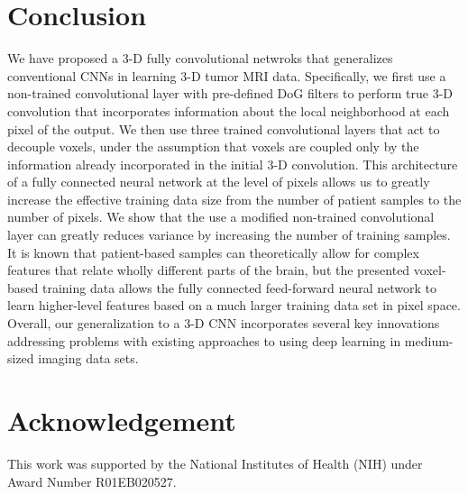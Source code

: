 \documentclass{llncs}
\begin{document}
\section{Conclusion}
We have proposed a 3-D fully convolutional netwroks that generalizes conventional CNNs in learning 3-D tumor MRI data. Specifically, we first use a non-trained convolutional layer with pre-defined DoG filters to perform true 3-D convolution that incorporates information about the local neighborhood at each pixel of the output. We then use three trained convolutional layers that act to decouple voxels, under the assumption that voxels are coupled only by the information already incorporated in the initial 3-D convolution. This architecture of a fully connected neural network at the level of pixels allows us to greatly increase the effective training data size from the number of patient samples to the number of pixels. We show that the use a modified non-trained convolutional layer can greatly reduces variance by increasing the number of training samples. It is known that patient-based samples can theoretically allow for complex features that relate wholly different parts of the brain, but the presented voxel-based training data allows the fully connected feed-forward neural network to learn higher-level features based on a much larger training data set in pixel space. Overall, our generalization to a 3-D CNN incorporates several key innovations addressing problems with existing approaches to using deep learning in medium-sized imaging data sets. 
%
%
%
%
%
%
%
%

\section{Acknowledgement}
This work was supported by the National Institutes of Health (NIH) under Award Number R01EB020527. 
\end{document}
